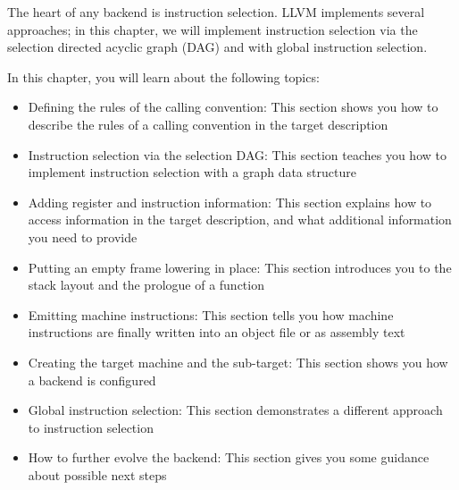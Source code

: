 The heart of any backend is instruction selection. LLVM implements several approaches; in this chapter, we will implement instruction selection via the selection directed acyclic graph (DAG) and with global instruction selection.

In this chapter, you will learn about the following topics:

\begin{itemize}
\item
Defining the rules of the calling convention: This section shows you how to describe the rules of a calling convention in the target description

\item
Instruction selection via the selection DAG: This section teaches you how to implement instruction selection with a graph data structure

\item
Adding register and instruction information: This section explains how to access information in the target description, and what additional information you need to provide

\item
Putting an empty frame lowering in place: This section introduces you to the stack layout and the prologue of a function

\item
Emitting machine instructions: This section tells you how machine instructions are finally written into an object file or as assembly text

\item
Creating the target machine and the sub-target: This section shows you how a backend is configured

\item
Global instruction selection: This section demonstrates a different approach to instruction selection

\item
How to further evolve the backend: This section gives you some guidance about possible next steps
\end{itemize}


